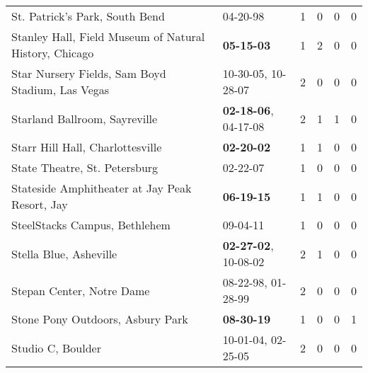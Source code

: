 \begin{longtable}{p{}p{}p{}p{}p{}p{}}
                                               St. Patrick's Park, South Bend &                                                04-20-98\textsuperscript{} &  1 &  0 &  0 &  0 \\
                       Stanley Hall, Field Museum of Natural History, Chicago &                                       \textbf{05-15-03\textsuperscript{}} &  1 &  2 &  0 &  0 \\
                             Star Nursery Fields, Sam Boyd Stadium, Las Vegas &                    10-30-05\textsuperscript{}, 10-28-07\textsuperscript{} &  2 &  0 &  0 &  0 \\
                                                Starland Ballroom, Sayreville &           \textbf{02-18-06\textsuperscript{}}, 04-17-08\textsuperscript{} &  2 &  1 &  1 &  0 \\
                                             Starr Hill Hall, Charlottesville &                                       \textbf{02-20-02\textsuperscript{}} &  1 &  1 &  0 &  0 \\
                                                State Theatre, St. Petersburg &                                                02-22-07\textsuperscript{} &  1 &  0 &  0 &  0 \\
                               Stateside Amphitheater at Jay Peak Resort, Jay &                                       \textbf{06-19-15\textsuperscript{}} &  1 &  1 &  0 &  0 \\
                                                SteelStacks Campus, Bethlehem &                                                09-04-11\textsuperscript{} &  1 &  0 &  0 &  0 \\
                                                       Stella Blue, Asheville &           \textbf{02-27-02\textsuperscript{}}, 10-08-02\textsuperscript{} &  2 &  1 &  0 &  0 \\
                                                    Stepan Center, Notre Dame &                    08-22-98\textsuperscript{}, 01-28-99\textsuperscript{} &  2 &  0 &  0 &  0 \\
                                             Stone Pony Outdoors, Asbury Park &                                       \textbf{08-30-19\textsuperscript{}} &  1 &  0 &  0 &  1 \\
                                                            Studio C, Boulder &                    10-01-04\textsuperscript{}, 02-25-05\textsuperscript{} &  2 &  0 &  0 &  0 \\

\end{longtable}
